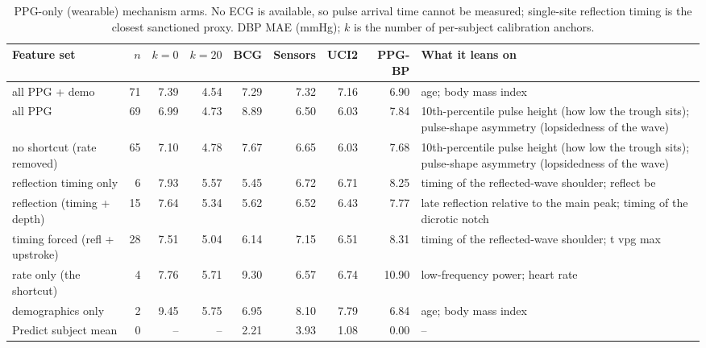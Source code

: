 \begin{table}[t]
\centering
\small
\caption{PPG-only (wearable) mechanism arms. No ECG is available, so pulse arrival time cannot be measured; single-site reflection timing is the closest sanctioned proxy. DBP MAE (mmHg); $k$ is the number of per-subject calibration anchors.}
\label{tab:ppgmech}
\begin{tabular}{l r r r rrrr l}
\toprule
Feature set & $n$ & $k{=}0$ & $k{=}20$ & BCG & Sensors & UCI2 & PPG-BP & What it leans on \\
\midrule
all PPG + demo & 71 & 7.39 & 4.54 & 7.29 & 7.32 & 7.16 & 6.90 & age; body mass index \\
all PPG & 69 & 6.99 & 4.73 & 8.89 & 6.50 & 6.03 & 7.84 & 10th-percentile pulse height (how low the trough sits); pulse-shape asymmetry (lopsidedness of the wave) \\
no shortcut (rate removed) & 65 & 7.10 & 4.78 & 7.67 & 6.65 & 6.03 & 7.68 & 10th-percentile pulse height (how low the trough sits); pulse-shape asymmetry (lopsidedness of the wave) \\
reflection timing only & 6 & 7.93 & 5.57 & 5.45 & 6.72 & 6.71 & 8.25 & timing of the reflected-wave shoulder; reflect be \\
reflection (timing + depth) & 15 & 7.64 & 5.34 & 5.62 & 6.52 & 6.43 & 7.77 & late reflection relative to the main peak; timing of the dicrotic notch \\
timing forced (refl + upstroke) & 28 & 7.51 & 5.04 & 6.14 & 7.15 & 6.51 & 8.31 & timing of the reflected-wave shoulder; t vpg max \\
rate only (the shortcut) & 4 & 7.76 & 5.71 & 9.30 & 6.57 & 6.74 & 10.90 & low-frequency power; heart rate \\
demographics only & 2 & 9.45 & 5.75 & 6.95 & 8.10 & 7.79 & 6.84 & age; body mass index \\
\midrule
Predict subject mean & 0 & -- & -- & 2.21 & 3.93 & 1.08 & 0.00 & -- \\
\bottomrule
\end{tabular}
\end{table}